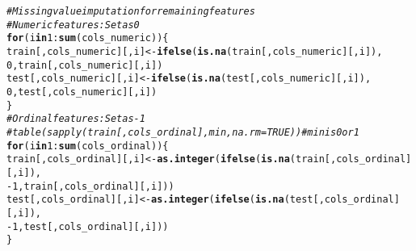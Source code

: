 \documentclass{article}\usepackage[]{graphicx}\usepackage[]{color}
\makeatletter
\newcommand{\hlnum}[1]{\textcolor[rgb]{0.686,0.059,0.569}{#1}}%
\newcommand{\hlcom}[1]{\textcolor[rgb]{0.678,0.584,0.686}{\textit{#1}}}%
\newcommand{\hlopt}[1]{\textcolor[rgb]{0,0,0}{#1}}%
\newcommand{\hlstd}[1]{\textcolor[rgb]{0.345,0.345,0.345}{#1}}%
\newcommand{\hlkwa}[1]{\textcolor[rgb]{0.161,0.373,0.58}{\textbf{#1}}}%
\newcommand{\hlkwb}[1]{\textcolor[rgb]{0.69,0.353,0.396}{#1}}%
\newcommand{\hlkwd}[1]{\textcolor[rgb]{0.737,0.353,0.396}{\textbf{#1}}}%
\newenvironment{kframe}{%
 \def\at@end@of@kframe{}%
 \ifinner\ifhmode%
  \def\at@end@of@kframe{\end{minipage}}%
  \begin{minipage}{\columnwidth}%
 \fi\fi%
 \def\FrameCommand##1{\hskip\@totalleftmargin \hskip-\fboxsep
 \colorbox{shadecolor}{##1}\hskip-\fboxsep
     \hskip-\linewidth \hskip-\@totalleftmargin \hskip\columnwidth}%
 \MakeFramed {\advance\hsize-\width
   \@totalleftmargin\z@ \linewidth\hsize
   \@setminipage}}%
 {\par\unskip\endMakeFramed%
 \at@end@of@kframe}
\newenvironment{knitrout}{}{} %
\makeatother
\begin{document}
\begin{knitrout}
\begin{kframe}
\begin{alltt}
\hlcom{# Missing value imputation for remaining features}
\hlcom{# Numeric features: Set as 0}
\hlkwa{for} \hlstd{(i} \hlkwa{in} \hlnum{1}\hlopt{:}\hlkwd{sum}\hlstd{(cols_numeric)) \{}
  \hlstd{train[, cols_numeric][, i]} \hlkwb{<-} \hlkwd{ifelse}\hlstd{(}\hlkwd{is.na}\hlstd{(train[, cols_numeric][, i]),}
                                       \hlnum{0}\hlstd{, train[, cols_numeric][, i])}
  \hlstd{test[, cols_numeric][, i]} \hlkwb{<-} \hlkwd{ifelse}\hlstd{(}\hlkwd{is.na}\hlstd{(test[, cols_numeric][, i]),}
                                      \hlnum{0}\hlstd{, test[, cols_numeric][, i])}
\hlstd{\}}
\hlcom{# Ordinal features: Set as -1}
\hlcom{# table(sapply(train[, cols_ordinal], min, na.rm = TRUE)) # min is 0 or 1}
\hlkwa{for} \hlstd{(i} \hlkwa{in} \hlnum{1}\hlopt{:}\hlkwd{sum}\hlstd{(cols_ordinal)) \{}
  \hlstd{train[, cols_ordinal][, i]} \hlkwb{<-} \hlkwd{as.integer}\hlstd{(}\hlkwd{ifelse}\hlstd{(}\hlkwd{is.na}\hlstd{(train[, cols_ordinal][, i]),}
                                              \hlopt{-}\hlnum{1}\hlstd{, train[, cols_ordinal][, i]))}
  \hlstd{test[, cols_ordinal][, i]} \hlkwb{<-} \hlkwd{as.integer}\hlstd{(}\hlkwd{ifelse}\hlstd{(}\hlkwd{is.na}\hlstd{(test[, cols_ordinal][, i]),}
                                             \hlopt{-}\hlnum{1}\hlstd{, test[, cols_ordinal][, i]))}
\hlstd{\}}


\end{alltt}
\end{kframe}
\end{knitrout}
\end{document}
